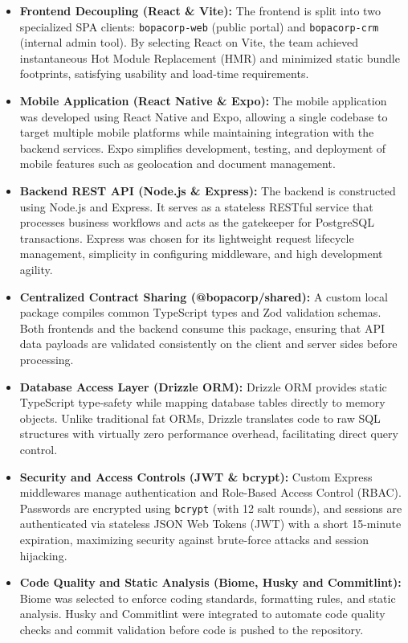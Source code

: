 \documentclass[letterpaper%
, oneside%
, 12pt%
, memoireprojet%
, english%
,creativecommons,hyperref, withAlgo2e %
]{thETS}
\begin{document}
\begin{itemize}
    \item \textbf{Frontend Decoupling (React \& Vite):} The frontend is split into two specialized SPA clients: \texttt{bopacorp-web} (public portal) and \texttt{bopacorp-crm} (internal admin tool). By selecting React on Vite, the team achieved instantaneous Hot Module Replacement (HMR) and minimized static bundle footprints, satisfying usability and load-time requirements.
        \item \textbf{Mobile Application (React Native \& Expo):} The mobile application was developed using React Native and Expo, allowing a single codebase to target multiple mobile platforms while maintaining integration with the backend services. Expo simplifies development, testing, and deployment of mobile features such as geolocation and document management.
    \item \textbf{Backend REST API (Node.js \& Express):} The backend is constructed using Node.js and Express. It serves as a stateless RESTful service that processes business workflows and acts as the gatekeeper for PostgreSQL transactions. Express was chosen for its lightweight request lifecycle management, simplicity in configuring middleware, and high development agility.
    \item \textbf{Centralized Contract Sharing (@bopacorp/shared):} A custom local package compiles common TypeScript types and Zod validation schemas. Both frontends and the backend consume this package, ensuring that API data payloads are validated consistently on the client and server sides before processing.
    \item \textbf{Database Access Layer (Drizzle ORM):} Drizzle ORM provides static TypeScript type-safety while mapping database tables directly to memory objects. Unlike traditional fat ORMs, Drizzle translates code to raw SQL structures with virtually zero performance overhead, facilitating direct query control.
    \item \textbf{Security and Access Controls (JWT \& bcrypt):} Custom Express middlewares manage authentication and Role-Based Access Control (RBAC). Passwords are encrypted using \texttt{bcrypt} (with 12 salt rounds), and sessions are authenticated via stateless JSON Web Tokens (JWT) with a short 15-minute expiration, maximizing security against brute-force attacks and session hijacking.
    \item \textbf{Code Quality and Static Analysis (Biome, Husky and Commitlint):}
    Biome was selected to enforce coding standards, formatting rules, and static analysis. Husky and Commitlint were integrated to automate code quality checks and commit validation before code is pushed to the repository.

\end{itemize}
\end{document}
